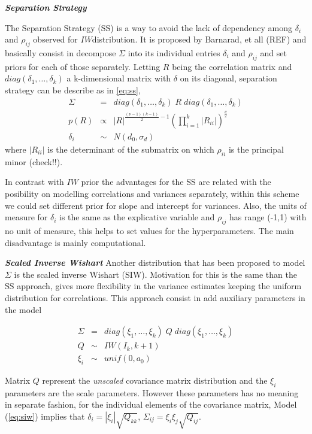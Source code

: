 \documentclass{article}
\begin{document}
\textbf{\emph{Separation Strategy }}

The Separation Strategy (SS) is a way to avoid the lack of dependency among $\delta_i$ and $\rho_{ij}$ observed for $IW$distribution. It is proposed by Barnarad, et all (REF) and basically consist in decompose $\Sigma$ into its individual entries $\delta_i$ and $\rho_{ij}$ and set priors for each of those separately.  Letting $R$ being the correlation matrix and $diag(\delta_1,\ldots, \delta_k)$ a k-dimensional matrix with $\delta$ on its diagonal, separation strategy can be describe as in \ref{eq:ss},  
\begin{eqnarray}
\nonumber \Sigma &=& diag(\delta_1,\ldots, \delta_k)\; R \; diag(\delta_1,\ldots, \delta_k) \\ 
\nonumber  p(R) &\propto& |R|^{\frac{(\nu-1)(k-1)}{2} -1}(\prod_{i=1}^k |R_{ii}|)^{\frac{\nu}{2}} \\
\delta_i &\sim& N(d_0, \sigma_{d})
\label{eq:ss}
\end{eqnarray} 
where $|R_{ii}|$ is the determinant of the submatrix on which $\rho_{ii}$ is the principal minor (check!!).  

In contrast with $IW$ prior the advantages for the SS are related with the posibility on modelling correlations and variances separately, within this scheme we could set different prior for slope and intercept for variances. Also, the units of measure for $\delta_i$ is the same as the explicative variable and $\rho_{ij}$ has range (-1,1) with no unit of measure, this helps to set values for the hyperparameters. The main disadvantage is mainly computational. 

\textbf{\emph{Scaled Inverse Wishart}}
Another distribution that has been proposed to model $\Sigma$ is the scaled inverse Wishart (SIW). Motivation for this is the same than the SS approach, gives more flexibility in the variance estimates keeping the uniform distribution for correlations. This approach consist in add auxiliary parameters in the model

\begin{eqnarray}
\nonumber \Sigma &=& diag(\xi_1,\ldots, \xi_k)\; Q \; diag(\xi_1,\ldots, \xi_k) \\ 
\nonumber  Q &\sim& IW(I_k, k+1) \\
\xi_i &\sim& unif(0, a_0)
\label{eq:siw}
\end{eqnarray}

Matrix $Q$ represent the \textsl{unscaled} covariance matrix distribution and the $\xi_i$ parameters are the scale parameters. However these parameters has no meaning in separate fashion, for the individual elements of the covariance matrix, Model (\ref{eq:siw})  implies that $\delta_i = |\xi_i|\sqrt{Q_{kk}}$, $\Sigma_{ij}=\xi_i\xi_j\sqrt{Q_{ij}}$.   
\end{document}
